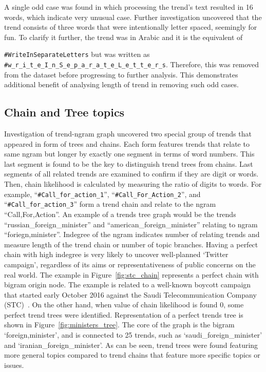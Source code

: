 \documentclass{comjnl}
\begin{document}
A single odd case was found in which processing the trend’s text resulted in 16 words, which indicate very unusual case. Further investigation uncovered that the trend consists of three words that were intentionally letter spaced, seemingly for fun. To clarify it further, the trend was in Arabic and it is the equivalent of {\texttt{\#WriteInSeparateLetters} but was written as {\footnotesize{{\texttt{\#w\_r\_i\_t\_e\_I\_n\_S\_e\_p\_a\_r\_a\_t\_e\_L\_e\_t\_t\_e\_r\_s}}}}. Therefore, this was removed from the dataset before progressing to further analysis. This demonstrates additional benefit of analysing length of trend in removing such odd cases.

\subsection{Chain and Tree topics}

Investigation of trend-ngram graph uncovered two special group of trends that appeared in form of trees and chains.  Each form features trends that relate to same ngram but longer by exactly one segment in terms of word numbers. This last segment is found to be the key to distinguish trend trees from chains. Last segments of all related trends are examined to confirm if they are digit or words. Then, chain likelihood is calculated by measuring the ratio of digits to words.  For example, “{\texttt{\#Call\_for\_action\_1}}”, “{\texttt{\#Call\_For\_Action\_2}}”, and “{\texttt{\#Call\_for\_action\_3}}” form a trend chain and relate to the ngram “Call,For,Action”. An example of a trends tree graph would be the trends “russian\_foreign\_minister” and “american\_foreign\_minister” relating to ngram “foriegn,minister”. Indegree of the ngram indicates number of relating trends and measure length of the trend chain or number of topic branches. Having a perfect chain with high indegree is very likely to uncover well-planned ‘Twitter campaign’, regardless of its aims or representativeness of public concerns on the real world.  The example in Figure~\ref{fig:stc_chain} represents a perfect chain with bigram origin node. The example is related to a well-known boycott campaign that started early October 2016 against the Saudi Telecommunication Company (STC)~\cite{naffee-2016}.  On the other hand, when value of chain likelihood is found 0, some perfect trend trees were identified. Representation of a perfect trends tree is shown in Figure~\ref{fig:ministers_tree}.  The core of the graph is the bigram ‘foreign,minister’, and is connected to 25 trends, such as ‘saudi\_foreign\_minister’ and ‘iranian\_foreign\_minister’. As can be seen, trend trees were found featuring more general topics compared to trend chains that feature more specific topics or issues.

}
\end{document}
